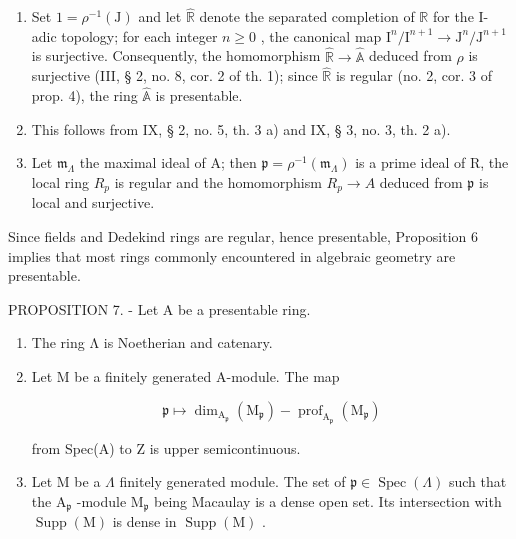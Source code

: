 \begin{enumerate}
\def\labelenumi{\alph{enumi})}
\setcounter{enumi}{1}
\item
  Set \(1 = \rho^{-1}(\mathrm{J})\) and let \(\widehat{\mathbb{R}}\) denote the separated completion of \(\mathbb{R}\) for the I-adic topology; for each integer \(n \geqslant 0\) , the canonical map \(\mathrm{I}^n / \mathrm{I}^{n+1} \to \mathrm{J}^n / \mathrm{J}^{n+1}\) is surjective. Consequently, the homomorphism \(\widehat{\mathbb{R}} \to \widehat{\mathbb{A}}\) deduced from \(\rho\) is surjective (III, § 2, no. 8, cor. 2 of th. 1); since \(\widehat{\mathbb{R}}\) is regular (no. 2, cor. 3 of prop. 4), the ring \(\widehat{\mathbb{A}}\) is presentable.
\item
  This follows from IX, § 2, no. 5, th. 3 a) and IX, § 3, no. 3, th. 2 a).
\item
  Let \(\mathfrak{m}_{\Lambda}\) the maximal ideal of A; then \(\mathfrak{p} = \mathfrak{\rho}^{-1}(\mathfrak{m}_{\Lambda})\) is a prime ideal of R, the local ring \(R_{p}\) is regular and the homomorphism \(R_{p} \to A\) deduced from \(\mathfrak{p}\) is local and surjective.
\end{enumerate}

Since fields and Dedekind rings are regular, hence presentable, Proposition 6 implies that most rings commonly encountered in algebraic geometry are presentable.

PROPOSITION 7. - Let A be a presentable ring.

\begin{enumerate}
\def\labelenumi{\alph{enumi})}
\item
  The ring Λ is Noetherian and catenary.
\item
  Let M be a finitely generated A-module. The map

\[
\mathfrak {p} \mapsto \dim_ {\mathrm{A} _ {\mathfrak {p}}} (\mathrm{M} _ {\mathfrak {p}}) - \operatorname{prof} _ {\mathrm{A} _ {\mathfrak {p}}} (\mathrm{M} _ {\mathfrak {p}})
\]

from Spec(A) to Z is upper semicontinuous.

\item
  Let M be a \(\Lambda\) finitely generated module. The set of \(\mathfrak{p} \in \operatorname{Spec}(\Lambda)\) such that the \(\mathrm{A}_{\mathfrak{p}}\) -module \(\mathrm{M}_{\mathfrak{p}}\) being Macaulay is a dense open set. Its intersection with \(\operatorname{Supp}(\mathrm{M})\) is dense in \(\operatorname{Supp}(\mathrm{M})\) .
\end{enumerate}

